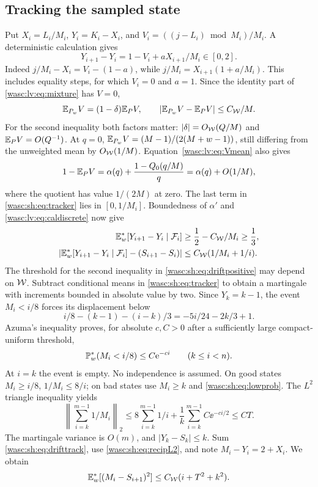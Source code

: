 \documentclass[11pt,a4paper]{article}
\theoremstyle{remark}\newtheorem{remark}[theorem]{Remark}
\numberwithin{equation}{section}
\begin{document}
\subsection{Tracking the sampled state}
Put $X_i=L_i/M_i$, $Y_i=K_i-X_i$, and
$V_i=((j-L_i)\bmod M_i)/M_i$. A deterministic calculation gives
\begin{equation}\label{wasc:sh:eq:tracker}
Y_{i+1}-Y_i=1-V_i+aX_{i+1}/M_i\in[0,2].
\end{equation}
Indeed $j/M_i-X_i=V_i-(1-a)$, while $j/M_i=X_{i+1}(1+a/M_i)$.
This includes equality steps, for which $V_i=0$ and $a=1$.
Since the identity part of \eqref{wasc:lv:eq:mixture} has $V=0$,
\begin{equation}\label{wasc:sh:eq:driftperturb}
\mathbb E_{P_w}V=(1-\delta)\mathbb E_PV,\qquad
|\mathbb E_{P_w}V-\mathbb E_PV|\le C_{\mathcal W}/M.
\end{equation}
For the second inequality both factors matter: $|\delta|=O_{\mathcal W}(Q/M)$ and
$\mathbb E_PV=O(Q^{-1})$. At $q=0$,
$\mathbb E_{P_w}V=(M-1)/(2(M+w-1))$, still differing from the unweighted mean by $O_{\mathcal W}(1/M)$.
Equation~\eqref{wasc:lv:eq:Vmean} also gives
\begin{equation}\label{wasc:sh:eq:ordinarydrift}
1-\mathbb E_PV=\alpha(q)+\frac{1-Q_0(q/M)}q=\alpha(q)+O(1/M),
\end{equation}
where the quotient has value $1/(2M)$ at zero. The last term in \eqref{wasc:sh:eq:tracker} lies in $[0,1/M_i]$. Boundedness of $\alpha'$ and \eqref{wasc:lv:eq:caldiscrete} now give
\begin{align}
\mathbb E_w^*[Y_{i+1}-Y_i\mid\mathcal F_i]&\ge\frac12-C_{\mathcal W}/M_i\ge\frac13,
\label{wasc:sh:eq:driftpositive}\\
\left|\mathbb E_w^*[Y_{i+1}-Y_i\mid\mathcal F_i]-(S_{i+1}-S_i)\right|
&\le C_{\mathcal W}(1/M_i+1/i).\label{wasc:sh:eq:drifttrack}
\end{align}
The threshold for the second inequality in \eqref{wasc:sh:eq:driftpositive} may depend on $\mathcal W$.
Subtract conditional means in \eqref{wasc:sh:eq:tracker} to obtain a martingale with increments bounded in absolute value by two. Since $Y_k=k-1$, the event $M_i<i/8$ forces its displacement below
\[
i/8-(k-1)-(i-k)/3=-5i/24-2k/3+1.
\]
Azuma's inequality proves, for absolute $c,C>0$ after a sufficiently large compact-uniform threshold,
\begin{equation}\label{wasc:sh:eq:lowprob}
\mathbb P_w^*(M_i<i/8)\le C\mathrm e^{-ci}\qquad(k\le i<n).
\end{equation}
At $i=k$ the event is empty. No independence is assumed.
On good states $M_i\ge i/8$, $1/M_i\le8/i$; on bad states use $M_i\ge k$ and \eqref{wasc:sh:eq:lowprob}. The $L^2$ triangle inequality yields
\begin{equation}\label{wasc:sh:eq:recipL2}
\left\|\sum_{i=k}^{m-1}1/M_i\right\|_2
\le8\sum_{i=k}^{m-1}1/i+\frac1k\sum_{i=k}^{m-1}C\ee^{-ci/2}
\le CT.
\end{equation}
The martingale variance is $O(m)$, and $|Y_k-S_k|\le k$. Sum \eqref{wasc:sh:eq:drifttrack}, use \eqref{wasc:sh:eq:recipL2}, and note $M_i-Y_i=2+X_i$. We obtain
\begin{equation}\label{wasc:sh:eq:trackingL2}
\mathbb E_w^*[(M_i-S_{i+1})^2]\le C_{\mathcal W}(i+T^2+k^2).
\end{equation}
\end{document}
